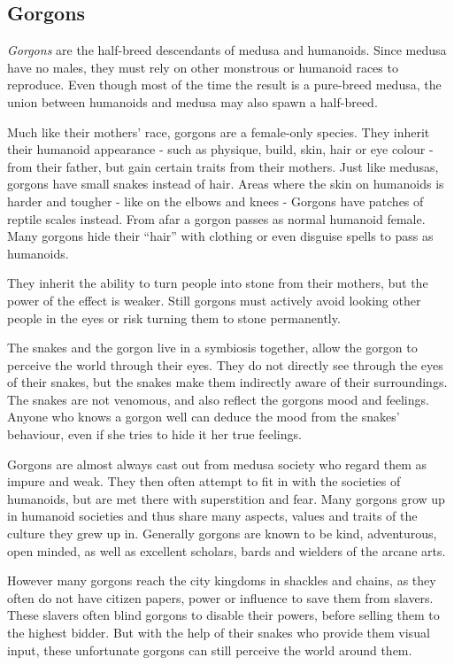 \subsection{Gorgons}
\label{sec:Gorgons}

\emph{Gorgons} are the half-breed descendants of medusa and humanoids. Since
medusa have no males, they must rely on other monstrous or humanoid races to
reproduce. Even though most of the time the result is a pure-breed medusa, the
union between humanoids and medusa may also spawn a half-breed.

Much like their mothers' race, gorgons are a female-only species. They
inherit their humanoid appearance - such as physique, build, skin, hair or eye
colour - from their father, but gain certain traits from their mothers. Just
like medusas, gorgons have small snakes instead of hair. Areas where the skin
on humanoids is harder and tougher - like on the elbows and knees - Gorgons
have patches of reptile scales instead. From afar a gorgon passes as normal
humanoid female. Many gorgons hide their ``hair'' with clothing or even
disguise spells to pass as humanoids.

They inherit the ability to turn people into stone from their mothers, but
the power of the effect is weaker. Still gorgons must actively avoid looking
other people in the eyes or risk turning them to stone permanently.

The snakes and the gorgon live in a symbiosis together, allow the gorgon to
perceive the world through their eyes. They do not directly see through the
eyes of their snakes, but the snakes make them indirectly aware of their
surroundings. The snakes are not venomous, and also reflect the gorgons mood
and feelings. Anyone who knows a gorgon well can deduce the mood from the
snakes' behaviour, even if she tries to hide it her true feelings.

Gorgons are almost always cast out from medusa society who regard them as impure
and weak. They then often attempt to fit in with the societies of humanoids,
but are met there with superstition and fear. Many gorgons grow up in humanoid
societies and thus share many aspects, values and traits of the culture they
grew up in. Generally gorgons are known to be kind, adventurous, open minded,
as well as excellent scholars, bards and wielders of the arcane arts.

However many gorgons reach the city kingdoms in shackles and chains, as they
often do not have citizen papers, power or influence to save them from
slavers. These slavers often blind gorgons to disable their powers, before
selling them to the highest bidder. But with the help of their snakes who
provide them visual input, these unfortunate gorgons can still perceive the
world around them.

